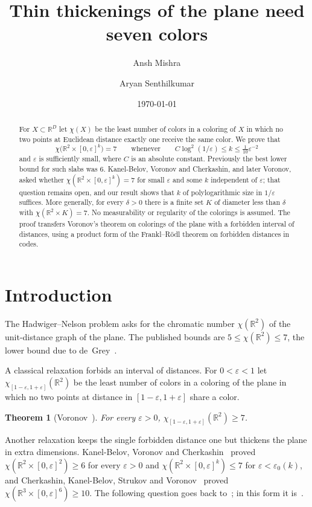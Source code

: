 \documentclass[11pt]{amsart}
\title{Thin thickenings of the plane need seven colors}
\author{Ansh Mishra}
\author{Aryan Senthilkumar}
\date{\today}
\newtheorem{theorem}{Theorem}
\theoremstyle{definition}
\theoremstyle{remark}
\newcommand{\R}{\mathbb{R}}
\begin{document}
\begin{abstract}
For $X\subset\R^D$ let $\chi(X)$ be the least number of colors in a coloring of $X$ in which
no two points at Euclidean distance exactly one receive the same color. We prove that
\[
  \chi\bigl(\R^2\times[0,\varepsilon]^k\bigr)=7
  \qquad\text{whenever}\qquad
  C\log^2(1/\varepsilon)\le k\le \tfrac1{10}\varepsilon^{-2}
\]
and $\varepsilon$ is sufficiently small, where $C$ is an absolute constant. Previously the
best lower bound for such slabs was $6$. Kanel-Belov, Voronov and Cherkashin, and later Voronov,
asked whether $\chi(\R^2\times[0,\varepsilon]^k)=7$ for small $\varepsilon$ and some $k$
independent of $\varepsilon$; that question remains open, and our result shows that $k$ of
polylogarithmic size in $1/\varepsilon$ suffices. More
generally, for every $\delta>0$ there is a finite set $K$ of diameter less than $\delta$ with
$\chi(\R^2\times K)=7$. No measurability or regularity of the colorings is assumed. The proof
transfers Voronov's theorem on colorings of the plane with a forbidden interval of distances,
using a product form of the Frankl--R\"odl theorem on forbidden distances in codes.
\end{abstract}

\maketitle

\section{Introduction}

The Hadwiger--Nelson problem asks for the chromatic number $\chi(\R^2)$ of the unit-distance
graph of the plane. The published bounds are $5\le\chi(\R^2)\le7$, the lower bound due to
de~Grey~\cite{deGrey}.

A classical relaxation forbids an interval of distances. For $0<\varepsilon<1$ let
$\chi_{[1-\varepsilon,1+\varepsilon]}(\R^2)$ be the least number of colors in a coloring of the
plane in which no two points at distance in $[1-\varepsilon,1+\varepsilon]$ share a color.

\begin{theorem}[Voronov~{\cite[Theorem~1.1]{Voronov}}]\label{thm:voronov}
For every $\varepsilon>0$, $\chi_{[1-\varepsilon,1+\varepsilon]}(\R^2)\ge7$.
\end{theorem}

Another relaxation keeps the single forbidden distance one but thickens the plane in extra
dimensions. Kanel-Belov, Voronov and Cherkashin~\cite{KVC} proved
$\chi(\R^2\times[0,\varepsilon]^2)\ge6$ for every $\varepsilon>0$ and
$\chi(\R^2\times[0,\varepsilon]^k)\le7$ for $\varepsilon<\varepsilon_0(k)$, and
Cherkashin, Kanel-Belov, Strukov and Voronov~\cite{CKSV} proved
$\chi(\R^3\times[0,\varepsilon]^6)\ge10$. The following question goes back to~\cite{KVC}; in this
form it is~\cite[Question~7.2]{Voronov}.
\end{document}
